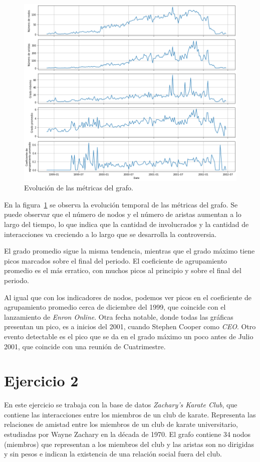 \documentclass{article}
\begin{document}
\begin{figure}[htb]
    \centering
    \includegraphics[width=\linewidth]{imagenes/ej1/metricas_grafo.png}
    \caption{Evolución de las métricas del grafo.}
    \label{fig:metricas_grafo}
\end{figure}

En la figura~\ref{fig:metricas_grafo} se observa la evolución temporal de las métricas del grafo. Se puede observar que el número de nodos y el número de aristas aumentan a lo largo del tiempo, lo que indica que la cantidad de involucrados y la cantidad de interacciones va creciendo a lo largo que se desarrolla la controversia.

El grado promedio sigue la misma tendencia, mientras que el grado máximo tiene picos marcados sobre el final del periodo. El coeficiente de agrupamiento promedio es el más erratico, con muchos picos al principio y sobre el final del periodo.

Al igual que con los indicadores de nodos, podemos ver picos en el coeficiente de agrupamiento promedio cerca de diciembre del 1999, que coincide con el lanzamiento de \emph{Enron Online}. Otra fecha notable, donde todas las gráficas presentan un pico, es a inicios del 2001, cuando Stephen Cooper como \emph{CEO}. Otro evento detectable es el pico que se da en el grado máximo un poco antes de Julio 2001, que coincide con una reunión de Cuatrimestre.

\section{Ejercicio 2} \label{sec: ej2}
En este ejercicio se trabaja con la base de datos \textit{Zachary's Karate Club}, que contiene las interacciones entre los miembros de un club de karate. Representa las relaciones de amistad entre los miembros de un club de karate universitario, estudiadas por Wayne Zachary en la década de 1970. El grafo contiene 34 nodos (miembros) que representan a los miembros del club y las aristas son no dirigidas y sin pesos e indican la existencia de una relación social fuera del club.
\end{document}
